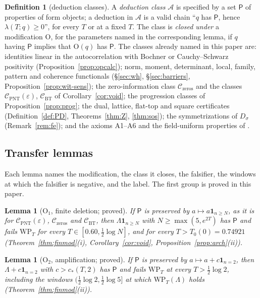 \documentclass[11pt]{amsart}
\newtheorem{lemma}[theorem]{Lemma}
\theoremstyle{definition}
\newtheorem{definition}[theorem]{Definition}
\theoremstyle{remark}
\begin{document}
\begin{definition}[deduction classes]\label{def:shape-class}
A \emph{deduction class} $\mathcal A$ is specified by a set $\mathsf P$ of properties of form objects; a deduction in $\mathcal A$ is a
valid chain ``$q$ has $\mathsf P$, hence $\lambda(T;q)\ge0$'', for every $T$ or at a fixed $T$. The class is \emph{closed under} a
modification $\mathrm O$, for the parameters named in the corresponding lemma, if $q$ having $\mathsf P$ implies that $\mathrm O(q)$
has $\mathsf P$. The classes already named in this paper are: identities linear in the autocorrelation with Bochner or Cauchy--Schwarz
positivity (Proposition~\ref{prop:opcalc}); norm, moment, determinant, local, family, pattern and coherence functionals
(\S\ref{sec:wh}, \S\ref{sec:barriers}, Proposition~\ref{prop:wit-sens}); the zero-information class $\mathcal C_{\mathrm{zeros}}$ and
the classes $\mathcal C_{\mathrm{PNT}}(\varepsilon)$, $\mathcal C_{\mathrm{BT}}$ of Corollary~\ref{cor:void}; the progression classes of
Proposition~\ref{prop:prog}; the dual, lattice, flat-top and square certificates (Definition~\ref{def:PD}, Theorems~\ref{thm:Z},
\ref{thm:sos}); the symmetrizations of $D_\sigma$ (Remark~\ref{rem:fe}); and the axioms A1--A6 and the field-uniform properties of
\cite{Paper46}.
\end{definition}

\subsection{Transfer lemmas}

Each lemma names the modification, the class it closes, the falsifier, the windows at which the falsifier is negative, and the label.
The first group is proved in this paper.

\begin{lemma}[$\mathrm O_1$, finite deletion; proved]\label{lem:shape-del}
If $\mathsf P$ is preserved by $a\mapsto a\mathbf 1_{n\ge N}$, as it is for $\mathcal C_{\mathrm{PNT}}(\varepsilon)$,
$\mathcal C_{\mathrm{zeros}}$ and $\mathcal C_{\mathrm{BT}}$, then $\Lambda\mathbf 1_{n\ge N}$ with $N\ge\max(5,e^{2T})$ has $\mathsf P$
and fails $\mathrm{WP}_T$ for every $T\in[0.60,\frac12\log N]$, and for every $T>T_0(0)=0.74921$ (Theorem~\ref{thm:finmod}(i),
Corollary~\ref{cor:void}, Proposition~\ref{prop:arch}(ii)).
\end{lemma}

\begin{lemma}[$\mathrm O_2$, amplification; proved]\label{lem:shape-amp}
If $\mathsf P$ is preserved by $a\mapsto a+c\mathbf 1_{n=2}$, then $\Lambda+c\mathbf 1_{n=2}$ with $c>c_*(T,2)$ has $\mathsf P$ and fails
$\mathrm{WP}_T$ at every $T>\frac12\log2$, including the windows $(\frac12\log2,\frac12\log5]$ at which $\mathrm{WP}_T(\Lambda)$ holds
(Theorem~\ref{thm:finmod}(ii)).
\end{lemma}
\end{document}
